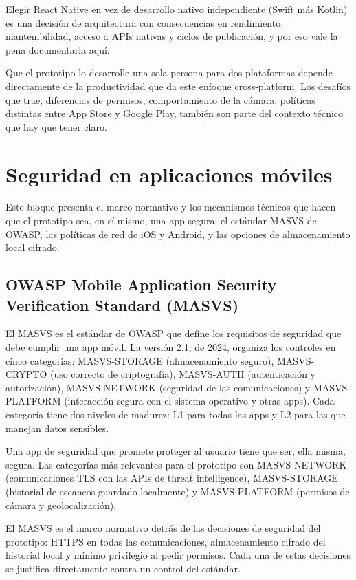 Elegir React Native en vez de desarrollo nativo independiente (Swift m\'as Kotlin) es una decisi\'on de arquitectura con consecuencias en rendimiento, mantenibilidad, acceso a APIs nativas y ciclos de publicaci\'on, y por eso vale la pena documentarla aqu\'i.

Que el prototipo lo desarrolle una sola persona para dos plataformas depende directamente de la productividad que da este enfoque cross-platform. Los desaf\'ios que trae, diferencias de permisos, comportamiento de la c\'amara, pol\'iticas distintas entre App Store y Google Play, tambi\'en son parte del contexto t\'ecnico que hay que tener claro.

\section{Seguridad en aplicaciones m\'oviles}

Este bloque presenta el marco normativo y los mecanismos t\'ecnicos que hacen que el prototipo sea, en s\'i mismo, una app segura: el est\'andar MASVS de OWASP, las pol\'iticas de red de iOS y Android, y las opciones de almacenamiento local cifrado.

\subsection{OWASP Mobile Application Security Verification Standard (MA\-SVS)}

El MASVS \cite{owasp2024masvs} es el est\'andar de OWASP que define los requisitos de seguridad que debe cumplir una app m\'ovil. La versi\'on 2.1, de 2024, organiza los controles en cinco categor\'ias: MASVS-STORAGE (almacenamiento seguro), MASVS-CRYPTO (uso correcto de criptograf\'ia), MASVS-AUTH (autenticaci\'on y autorizaci\'on), MASVS-NETWORK (seguridad de las comunicaciones) y MASVS-PLATFORM (interacci\'on segura con el sistema operativo y otras apps). Cada categor\'ia tiene dos niveles de madurez: L1 para todas las apps y L2 para las que manejan datos sensibles.

Una app de seguridad que promete proteger al usuario tiene que ser, ella misma, segura. Las categor\'ias m\'as relevantes para el prototipo son MASVS-NETWORK (comunicaciones TLS con las APIs de threat intelligence), MASVS-STORAGE (historial de escaneos guardado localmente) y MASVS-PLATFORM (permisos de c\'amara y geolocalizaci\'on).

El MASVS es el marco normativo detr\'as de las decisiones de seguridad del prototipo: HTTPS en todas las comunicaciones, almacenamiento cifrado del historial local y m\'inimo privilegio al pedir permisos. Cada una de estas decisiones se justifica directamente contra un control del est\'andar.

